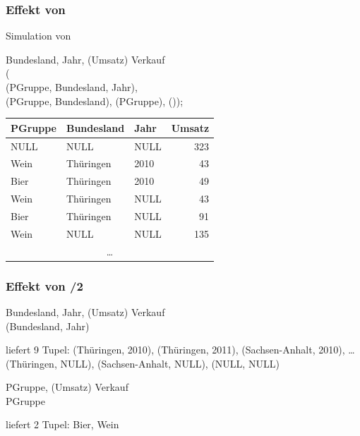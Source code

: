     \begin{frame}
    
      \frametitle{Effekt von }
    
      Simulation von 
      \begin{sql}
         Bundesland, Jahr, (Umsatz)  Verkauf \\
        ( \\
        \1 (PGruppe, Bundesland, Jahr), \\
        \1 (PGruppe, Bundesland), (PGruppe), ());
      \end{sql}
    
      {\small
      \begin{center}
        \begin{tabular}{|l|l|l|r|}
          \hline
        \rowcolor{Gray} \textbf{PGruppe} &  \textbf{Bundesland} & \textbf{Jahr} & \textbf{Umsatz} \\
      \hline\hline
      NULL & NULL & NULL & 323 \\
      Wein	& Thüringen	& 2010 &	43 \\
      Bier &	Thüringen	& 2010 &	49 \\
      Wein &	Thüringen & 	NULL &	43 \\
      Bier &	Thüringen	& NULL	 & 91 \\
      Wein		& NULL & NULL &			135 \\
      \multicolumn{4}{|c|}{\dots} \\
      \hline
        \end{tabular}
      \end{center}}
    
    \end{frame}
    
    \begin{frame}
    
      \frametitle{Effekt von  /2}
    
    \begin{sql}
       Bundesland, Jahr, (Umsatz)  Verkauf \\
      (Bundesland, Jahr)
    \end{sql}
    liefert 9 Tupel: (Thüringen, 2010), (Thüringen, 2011), (Sachsen-Anhalt, 2010), \dots (Thüringen, NULL), (Sachsen-Anhalt, NULL), (NULL, NULL)
    
    \begin{sql}
       PGruppe, (Umsatz)  Verkauf \\
       PGruppe
    \end{sql}
    
    liefert 2 Tupel: Bier, Wein
    \end{frame}
    
